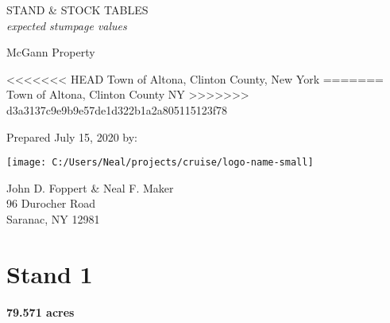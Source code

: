 \documentclass[landscape]{article}
\author{}
\date{\vspace{-2.5em}}
\begin{document}
\captionsetup[table]{labelformat=empty}
\captionsetup{justification=raggedright,singlelinecheck=false}

\vspace*{23pt}

\huge STAND \& STOCK TABLES\\
\large \emph{expected stumpage values}

\vspace{18pt}

\LARGE McGann Property

\vspace{16pt}

<<<<<<< HEAD
\Large Town of Altona, Clinton County, New York
=======
\Large Town of Altona, Clinton County NY
>>>>>>> d3a3137c9e9b9e57de1d322b1a2a805115123f78

\vspace{120pt}

\large Prepared July 15, 2020 by:

\vspace{20pt}

\texttt{[image: C:/Users/Neal/projects/cruise/logo-name-small]}

\normalsize John D. Foppert \& Neal F. Maker\\
96 Durocher Road\\
Saranac, NY 12981

\pagebreak
{}

\section{Stand 1}\label{stand-1}

\textbf{79.571 acres}
\end{document}
